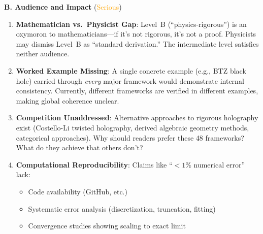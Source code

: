 \documentclass[12pt,a4paper]{article}
\begin{document}
\begin{tcolorbox}[colback=red!5!white, colframe=red!75!black, title=\textbf{RED TEAM Round 5: Strategic Critiques}]
\textbf{B. Audience and Impact} (\textcolor{orange}{Serious})

\begin{enumerate}[resume, label=\textbf{R5.\arabic*.}]
    \item \textbf{Mathematician vs.\ Physicist Gap}: Level~B (``physics-rigorous'') is an oxymoron to mathematicians---if it's not rigorous, it's not a proof. Physicists may dismiss Level~B as ``standard derivation.'' The intermediate level satisfies neither audience.
    
    \item \textbf{Worked Example Missing}: A single concrete example (e.g., BTZ black hole) carried through \emph{every} major framework would demonstrate internal consistency. Currently, different frameworks are verified in different examples, making global coherence unclear.
    
    \item \textbf{Competition Unaddressed}: Alternative approaches to rigorous holography exist (Costello-Li twisted holography, derived algebraic geometry methods, categorical approaches). Why should readers prefer these 48 frameworks? What do they achieve that others don't?
    
    \item \textbf{Computational Reproducibility}: Claims like ``$<1\%$ numerical error'' lack:
    \begin{itemize}
        \item Code availability (GitHub, etc.)
        \item Systematic error analysis (discretization, truncation, fitting)
        \item Convergence studies showing scaling to exact limit
    \end{itemize}
\end{enumerate}

\end{tcolorbox}

\vspace{1em}
\end{document}
